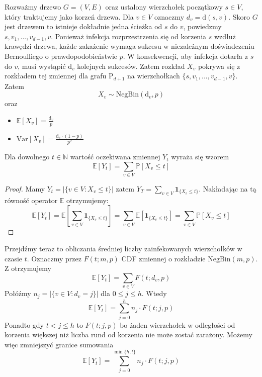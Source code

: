 Rozważmy drzewo $G = (V, E)$ oraz ustalony wierzchołek początkowy $s \in V$, 
który traktujemy jako korzeń drzewa. Dla $v\in V$ oznaczmy  $d_v=\mathrm{d}(s,v)$. Skoro $G$ jest drzewem to istnieje dokładnie jedna ścieżka od $s$ do $v$, powiedzmy $s,v_1,...,v_{d-1}, v$. Ponieważ infekcja rozprzestrzenia się od korzenia $s$ wzdłuż krawędzi drzewa, 
każde zakażenie wymaga sukcesu w niezależnym doświadczeniu Bernoulliego o prawdopodobieństwie $p$.
W konsekwencji, aby infekcja dotarła z $s$ do $v$, 
musi wystąpić $\mathrm{d}_v$ kolejnych sukcesów. Zatem rozkład $X_v$ pokrywa się z rozkładem tej zmiennej dla grafu $\mathrm{P}_{d+1}$ na wierzchołkach $\{s,v_1,...,v_{d-1}, v\}$. 
Zatem 
\[
    X_v\sim \mathrm{NegBin}(\mathrm{d}_v,p)
\]
oraz
\begin{itemize}
    \item $\mathbb{E}[X_v] = \frac{\mathrm{d}_v}{p}$
    \item $\mathrm{Var}[X_v] = \frac{\mathrm{d}_v\cdot(1 - p)}{p^2}$
\end{itemize}


\begin{lemma}\label{L:Formula_EYt}
Dla dowolnego $t\in\mathbb{N}$ wartość oczekiwana zmiennej $Y_t$ wyraża się wzorem
\[
    \mathbb{E}[Y_t] = \sum_{v\in V} \mathbb{P}[X_v \le t]
\]    
\end{lemma}

\begin{proof}
Mamy $Y_t=|\{v\in V: X_v \le t\}|$ zatem $Y_T=\sum_{v\in V}  \mathbf{1}_{\{X_v\le t\}}$. Nakładając na tą równość operator $\mathbb{E}$ otrzymujemy:
\[
    \mathbb{E}[Y_t] = \mathbb{E}\left[ \sum_{v\in V}  \mathbf{1}_{\{X_v\le t\}}\right]= \sum_{v\in V} \mathbb{E}[\mathbf{1}_{\{X_v\le t\}}] = \sum_{v\in V} \mathbb{P}[X_v \le t]
\]    
\end{proof}

Przejdźmy teraz to obliczania średniej liczby zainfekowanych wierzchołków w czasie $t$. Oznaczmy przez $F(t;m,p)$ CDF zmiennej o rozkładzie $\mathrm{NegBin}(m,p)$. Z  otrzymujemy
\[
    \mathbb{E}[Y_t] = \sum_{v\in V} F(t; d_v, p)
\]
Połóźmy $n_j = |\{v\in V: d_v=j\}|$ dla $0\le j \le h$. Wtedy 
\[
    \mathbb{E}[Y_t] = \sum_{j=0}^{h} n_j\cdot F(t; j, p)
\]
Ponadto gdy $t<j\le h$ to $F(t; j, p)$ bo żaden wierzchołek w odległości od korzenia większej niż liczba rund od korzenia nie może zostać zarażony. Możemy więc zmniejszyć granice sumowania 
\[
    \mathbb{E}[Y_t] = \sum_{j=0}^{\min\{h,t\}} n_j\cdot F(t; j, p)
\]

